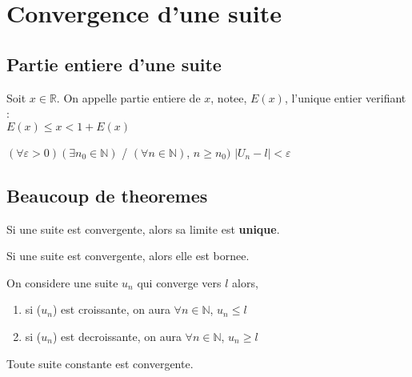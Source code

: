 \documentclass[a4paper,10pt]{book}
\begin{document}
	\section{Convergence d'une suite}
	\label{sec:Convergence d'une suite}

	\subsection{Partie entiere d'une suite}
	\label{sub:Partie entiere d'une suite}

	\begin{prop}
		Soit $x \in \mathbb{R}$. On appelle partie entiere de $x$, notee, $E(x)$, l'unique entier verifiant :\\

		$E(x) \leq x < 1+E(x)$

	\end{prop}

	\begin{prop}
		$(\forall \varepsilon > 0)(\exists n_0 \in \mathbb{N})$ / $(\forall n \in \mathbb{N})$, $n \geq n_0)$  $\left| U_n - l \right| < \varepsilon$
	\end{prop}

	\subsection{Beaucoup de theoremes}
	\label{sub:Beaucoup de theoremes}

	\begin{prop}
		Si une suite est convergente, alors sa limite est \textbf{unique}.
	\end{prop}

	\begin{prop}
		Si une suite est convergente, alors elle est bornee.
	\end{prop}

	\begin{prop}
		On considere une suite $u_n$ qui converge vers $l$ alors,
			\begin{enumerate}
				\item si ($u_n$) est croissante, on aura $\forall n \in \mathbb{N}$, $u_n \leq l$
				\item si ($u_n$) est decroissante, on aura $\forall n \in \mathbb{N}$, $u_n \geq l$
			\end{enumerate}
	\end{prop}

	\begin{prop}
		Toute suite constante est convergente.
	\end{prop}
\end{document}
